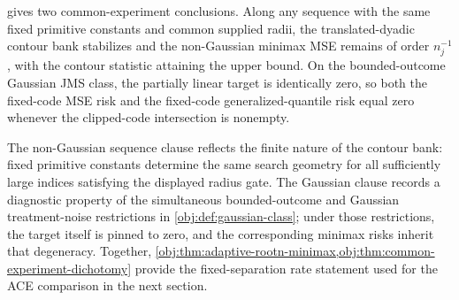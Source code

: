  gives two common-experiment conclusions. Along any sequence with the same fixed primitive constants and common supplied radii, the translated-dyadic contour bank stabilizes and the non-Gaussian minimax MSE remains of order \(n_j^{-1}\), with the contour statistic attaining the upper bound. On the bounded-outcome Gaussian JMS class, the partially linear target is identically zero, so both the fixed-code MSE risk and the fixed-code generalized-quantile risk equal zero whenever the clipped-code intersection is nonempty.

The non-Gaussian sequence clause reflects the finite nature of the contour bank: fixed primitive constants determine the same search geometry for all sufficiently large indices satisfying the displayed radius gate. The Gaussian clause records a diagnostic property of the simultaneous bounded-outcome and Gaussian treatment-noise restrictions in \cref{obj:def:gaussian-class}; under those restrictions, the target itself is pinned to zero, and the corresponding minimax risks inherit that degeneracy. Together, \cref{obj:thm:adaptive-rootn-minimax,obj:thm:common-experiment-dichotomy} provide the fixed-separation rate statement used for the ACE comparison in the next section.
